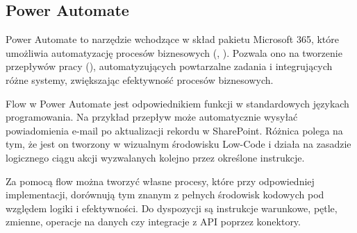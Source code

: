 \subsection{Power Automate \cite{v-aangie_official_nodate}}
Power Automate to narzędzie wchodzące w skład pakietu Microsoft 365, które umożliwia automatyzację procesów biznesowych (, ). Pozwala ono na tworzenie przepływów pracy (), automatyzujących powtarzalne zadania i integrujących różne systemy, zwiększając efektywność procesów biznesowych.

Flow w Power Automate jest odpowiednikiem funkcji w standardowych językach programowania. Na przykład przepływ może automatycznie wysyłać powiadomienia e-mail po aktualizacji rekordu w SharePoint. Różnica polega na tym, że jest on tworzony w wizualnym środowisku Low-Code i działa na zasadzie logicznego ciągu akcji wyzwalanych kolejno przez określone instrukcje.

Za pomocą flow można tworzyć własne procesy, które przy odpowiedniej implementacji, dorównują tym znanym z pełnych środowisk kodowych pod względem logiki i efektywności. Do dyspozycji są instrukcje warunkowe, pętle, zmienne, operacje na danych czy integracje z API poprzez konektory.
